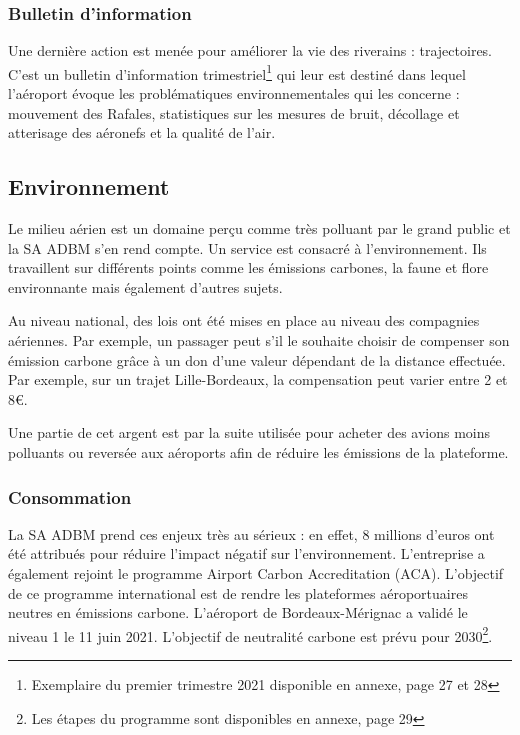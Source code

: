 \subsubsection{Bulletin d'information}

Une dernière action est menée pour améliorer la vie des riverains : trajectoires. C'est un bulletin d'information trimestriel\footnote{Exemplaire du premier trimestre 2021 disponible en annexe, page 27 et 28} qui leur est destiné dans lequel l'aéroport évoque les problématiques environnementales qui les concerne : mouvement des Rafales, statistiques sur les mesures de bruit, décollage et atterisage des aéronefs et la qualité de l'air.


\subsection{Environnement}

Le milieu aérien est un domaine perçu comme très polluant par le grand public et la SA ADBM s'en rend compte. Un service est consacré à l'environnement. Ils travaillent sur différents points comme les émissions carbones, la faune et flore environnante mais également d'autres sujets.


Au niveau national, des lois ont été mises en place au niveau des compagnies aériennes. Par exemple, un passager peut s'il le souhaite choisir de compenser son émission carbone grâce à un don d'une valeur dépendant de la distance effectuée. Par exemple, sur un trajet Lille-Bordeaux, la compensation peut varier entre 2 et 8€.

Une partie de cet argent est par la suite utilisée pour acheter des avions moins polluants ou reversée aux aéroports afin de réduire les émissions de la plateforme.

\subsubsection{Consommation}

La SA ADBM prend ces enjeux très au sérieux : en effet, 8 millions d'euros ont été attribués pour réduire l'impact négatif sur l'environnement.
L'entreprise a également rejoint le programme Airport Carbon Accreditation (ACA). L'objectif de ce programme international est de rendre les plateformes aéroportuaires neutres en émissions carbone.
L'aéroport de Bordeaux-Mérignac a validé le niveau 1 le 11 juin 2021. L'objectif de neutralité carbone est prévu pour 2030\footnote{Les étapes du programme sont disponibles en annexe, page 29}.

